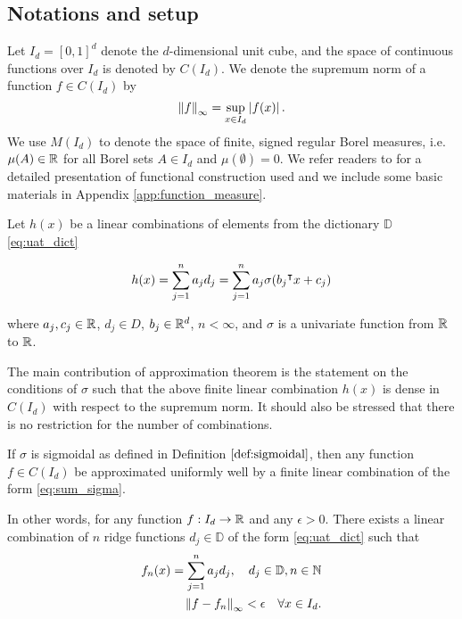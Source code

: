 \subsection*{Notations and setup}

Let $I_d = [0,1]^d$ denote the $d$-dimensional unit cube, and the space of
continuous functions over $I_d$ is denoted by $C(I_d)$. We denote the supremum
norm of a function $f \in C(I_d)$ by
\begin{equation}
    \label{def:sup_norm}
    \left\| f \right\|_{\infty} = \sup_{x\in I_d} \left| f(x) \right|.
\end{equation}
We use $M(I_d)$ to denote the space of finite, signed regular Borel measures,
i.e. $\mu(A) \in \mathbb{R}$ for all Borel sets $A \in I_d$ and $\mu(\emptyset)= 0$. We
refer readers to \cite{rudinFunctionalAnalysis1991,
rudinRealComplexAnalysis1987} for a detailed presentation of functional
construction used and we include some basic materials in Appendix
\ref{app:function_measure}.

Let $h(x)$ be a linear combinations of elements from the dictionary $\mathbb{D}$
\eqref{eq:uat_dict}

\begin{equation}
    \label{eq:sum_sigma}
    h(x) = \sum_{j=1}^n a_j d_j = \sum_{j=1}^n a_j \sigma(b_j{}^{\intercal} x + c_j)
\end{equation}

where $a_j, c_j \in \mathbb{R}$, $d_j \in D$,  $b_j \in \mathbb{R}^d$, $n < \infty$, and
$\sigma$ is a univariate function from $\mathbb{R}$ to $\mathbb{R}$.
 
The main contribution of approximation theorem is the statement on the
conditions of $\sigma$ such that the above finite linear combination $h(x)$ is
dense in $C(I_d)$ with respect to the supremum norm. It should also be stressed
that there is no restriction for the number of combinations.

\begin{theorem}
    \label{thm:uat}
    If $\sigma$ is sigmoidal as defined in Definition $\ref{def:sigmoidal}$,
    then any function $f \in C(I_d)$ be approximated uniformly well by a finite
    linear combination of the form \eqref{eq:sum_sigma}.

    In other words, for any function $f: I_d \to \mathbb{R}$ and any $\epsilon > 0$.
    There exists a linear combination of $n$ ridge functions $d_j \in
    \mathbb{D}$ of the form \eqref{eq:uat_dict} such that
    \begin{align}
        f_n(x) = \sum_{j=1}^n a_j d_j, \quad d_j \in \mathbb{D}, n\in\mathbb{N} \\
        \left\| f - f_n \right\|_{\infty} < \epsilon \quad \forall x \in I_d.
    \end{align}
\end{theorem}


